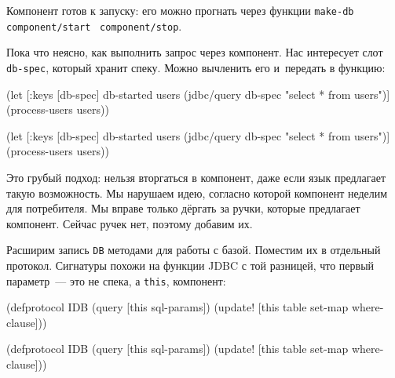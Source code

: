 Компонент готов к запуску: его можно прогнать через функции
\verb|make-db|~\arr{} \texttt{component\-/start}~\arr{} \verb|component/stop|.

Пока что неясно, как выполнить запрос через компонент. Нас интересует слот
\verb|db-spec|, который хранит спеку. Можно вычленить его и~передать в функцию:

\ifnarrow

\begin{english}
  \begin{clojure}
(let [{:keys [db-spec]} db-started
      users (jdbc/query db-spec
              "select * from users")]
  (process-users users))
  \end{clojure}
\end{english}

\else

\begin{english}
  \begin{clojure}
(let [{:keys [db-spec]} db-started
      users (jdbc/query db-spec "select * from users")]
  (process-users users))
  \end{clojure}
\end{english}

\fi

Это грубый подход: нельзя вторгаться в компонент, даже если язык предлагает
такую возможность. Мы нарушаем идею, согласно которой компонент неделим для
потребителя. Мы вправе только дёргать за ручки, которые предлагает
компонент. Сейчас ручек нет, поэтому добавим их.

Расширим запись \verb|DB| методами для работы с базой. Поместим их в отдельный
протокол. Сигнатуры похожи на функции JDBC с той разницей, что первый параметр~---
это не спека, а \verb|this|, компонент:


\ifnarrow

\begin{english}
  \begin{clojure}
(defprotocol IDB
  (query [this sql-params])
  (update!
    [this table set-map where-clause]))
  \end{clojure}
\end{english}

\else

\begin{english}
  \begin{clojure}
(defprotocol IDB
  (query [this sql-params])
  (update! [this table set-map where-clause]))
  \end{clojure}
\end{english}

